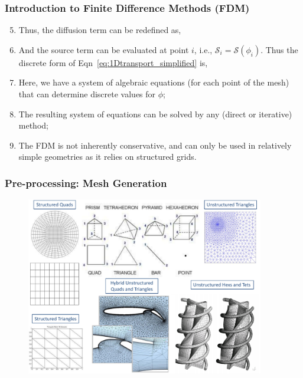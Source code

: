 \documentclass[10pt,compress,unknownkeysallowed]{beamer}
\begin{document}
\begin{frame}
  \frametitle{Introduction to Finite Difference Methods (FDM)}
\begin{enumerate}
   \setcounter{enumi}{4}
  \item <1-> Thus, the diffusion term can be redefined as,
  \item <2-> And the source term can be evaluated at point $i$, i.e., $\mathcal{S}_{i}=\mathcal{S}\left(\phi_{i}\right)$. Thus the discrete form of Eqn~\ref{eq:1Dtransport_simplified} is,
  \item <3-> Here, we have a system of algebraic equations (for each point of the mesh) that can determine discrete values for $\phi$;
  \item <4-> The resulting system of equations can be solved by any (direct or iterative) method;
  \item <5-> The FDM is not inherently conservative, and can only be used in relatively simple geometries as it relies on structured grids.
\end{enumerate}  
 
\end{frame}

\begin{frame}
 \frametitle{Pre-processing: Mesh Generation}

   \begin{figure}%
    \begin{center}
     \includegraphics[width=12.cm, height=7.8cm, clip]{./Pics/MeshGrid_Examples.pdf}\label{xx}
    \end{center}
   \end{figure}    

\end{frame}
\end{document}
